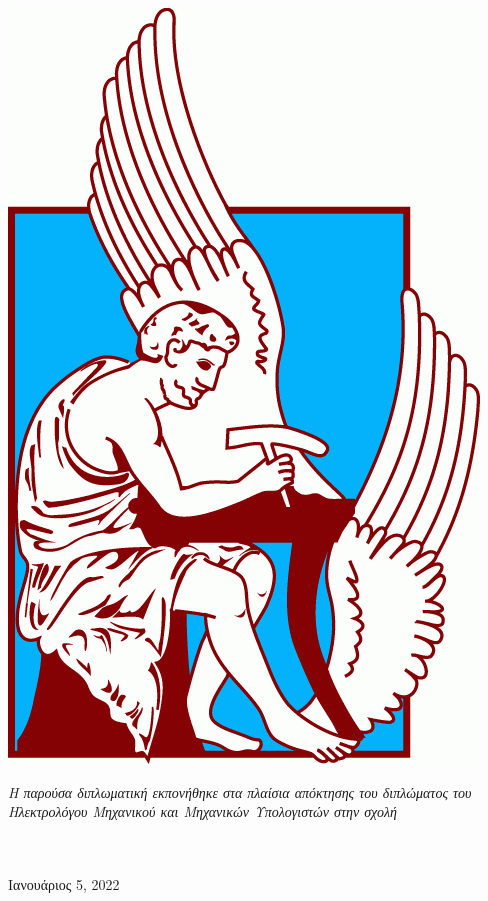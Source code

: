 \documentclass[
	12pt, %
	english, %
	onehalfspacing, %
	liststotoc, %
	toctotoc, %
	parskip, %
	headsepline, %
]{MastersDoctoralThesis} %
\begin{document}
\begin{titlepage}
\begin{center}
		\includegraphics[scale=0.22]{Images/TUC_logo.png} %
		\\[0.5cm]

		\vfill

		\large \textit{Η παρούσα διπλωματική εκπονήθηκε στα πλαίσια απόκτησης του διπλώματος του Ηλεκτρολόγου Μηχανικού και Μηχανικών Υπολογιστών στην σχολή}\\[0.1cm] %
		\deptname\\\groupname\\[0.4cm] %

		\vfill

		{\large Ιανουάριος 5, 2022 }\\[2cm] %

		\vfill
	\end{center}
\end{titlepage}
\end{document}
